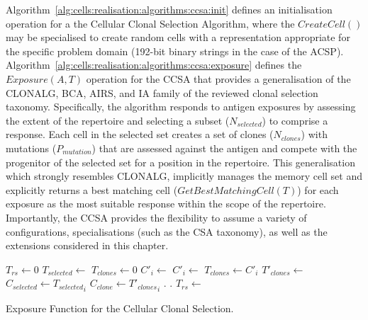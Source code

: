 Algorithm~\ref{alg:cells:realisation:algorithms:ccsa:init} defines an initialisation operation for a the Cellular Clonal Selection Algorithm, where the $CreateCell()$ may be specialised to create random cells with a representation appropriate for the specific problem domain (192-bit binary strings in the case of the ACSP). Algorithm~\ref{alg:cells:realisation:algorithms:ccsa:exposure} defines the $Exposure(A, T)$ operation for the CCSA that provides a generalisation of the CLONALG, BCA, AIRS, and IA family of the reviewed clonal selection taxonomy. Specifically, the algorithm responds to antigen exposures by assessing the extent of the repertoire and selecting a subset ($N_{selected}$) to comprise a response. Each cell in the selected set creates a set of clones ($N_{clones}$) with mutations ($P_{mutation}$) that are assessed against the antigen and compete with the progenitor of the selected set for a position in the repertoire. This generalisation which strongly resembles CLONALG, implicitly manages the memory cell set and explicitly returns a best matching cell ($GetBestMatchingCell(T)$) for each exposure as the most suitable response within the scope of the repertoire. Importantly, the CCSA provides the flexibility to assume a variety of configurations, specialisations (such as the CSA taxonomy), as well as the extensions considered in this chapter.

\begin{algorithm}[ht]
  \SetLine	
  
  
	
	
 	$T_{rs} \leftarrow0$\;
 	{
 		\;
 	}
	$T_{selected} \leftarrow$ \;
	{
		$T_{clones} \leftarrow 0$\;
		{
			${C\prime}_i \leftarrow$ \;
			${C\prime}_i \leftarrow$ \;
			$T_{clones} \leftarrow {C\prime}_i$\;
		}
		\;
		${T\prime}_{clones} \leftarrow$ \;
		{
			$C_{selected} \leftarrow {T_{selected}}_i$\;
			$C_{clone} \leftarrow {{T\prime}_{clones}}_i$\;
			{
				\Tissue.\;
				\Tissue.\;
			}
		}
	}
	$T_{rs} \leftarrow$ \GetBestMatchingCell{\Tissue}\;
	\caption{Exposure Function for the Cellular Clonal Selection.}
	\label{alg:cells:realisation:algorithms:ccsa:exposure}
\end{algorithm}

